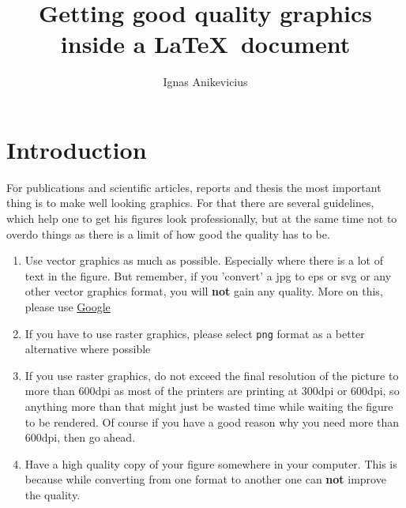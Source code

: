 

\usepackage[version=3]{mhchem}
\usepackage{float}
\usepackage{calc}
\usepackage[]{amsmath}

\usepackage[pdftex]{graphicx}
\graphicspath{{./figs/}}
\usepackage[update,verbose=false]{epstopdf}
\usepackage{tikz}
\newlength{\tikzunit}
\usepackage{subfig}
\newcommand{\compx}[1]{\textbf{#1}}


\title{Getting good quality graphics inside a \LaTeX\ document}
\author{Ignas Anikevicius}



\maketitle

\section{Introduction}

For publications and scientific articles, reports and thesis the most important
thing is to make well looking graphics. For that there are several guidelines,
which help one to get his figures look professionally, but at the same time not
to overdo things as there is a limit of how good the quality has to be.

\begin{enumerate}
    \item Use vector graphics as much as possible. Especially where there is a
        lot of text in the figure. But remember, if you 'convert' a jpg to eps
        or svg or any other vector graphics format, you will \textbf{not} gain
        any quality. More on this, please use
        \href{http://www.google.co.uk}{Google}
    \item If you have to use raster graphics, please select \verb|png| format as
        a better alternative where possible
    \item If you use raster graphics, do not exceed the final resolution of the
        picture to more than 600dpi as most of the printers are printing at
        300dpi or 600dpi, so anything more than that might just be wasted time
        while waiting the figure to be rendered. Of course if you have a good
        reason why you need more than 600dpi, then go ahead.
    \item Have a high quality copy of your figure somewhere in your computer.
        This is because while converting from one format to another one can
        \textbf{not} improve the quality.
\end{enumerate}

